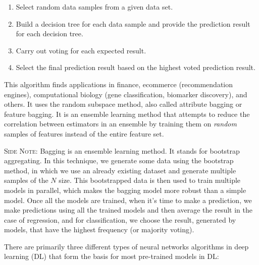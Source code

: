 \documentclass[11pt]{article}
\begin{document}
\begin{itemize}
\begin{enumerate} 
\item Select random data samples from a given data set.
\item Build a decision tree for each data sample and provide the prediction result for each decision tree.
\item Carry out voting for each expected result.
\item  Select the final prediction result based on the highest voted prediction result.
\end{enumerate} 
This algorithm finds applications in finance, ecommerce (recommendation engines), computational biology (gene classification, biomarker discovery), and others. It uses the random subspace method, also called attribute bagging or feature bagging. It is an ensemble learning method that attempts to reduce the correlation between estimators in an ensemble by training them on \emph{random} samples of features instead of the entire feature set.

\textsc{Side Note:} Bagging is an ensemble learning method. It stands for bootstrap aggregating. In this technique, we generate some data using the bootstrap method, in which we use an already existing dataset and generate multiple samples of the $N$ size. This bootstrapped data is then used to train multiple models in parallel, which makes the bagging model more robust than a simple model. Once all the models are trained, when it’s time to make a prediction, we make predictions using all the trained models and then average the result in the case of regression, and for classification, we choose the result, generated by models, that have the highest frequency (or majority voting).



\end{itemize} 

There are primarily three different types of neural networks algorithms in deep learning (DL) that form the basis for most pre-trained models in DL:
\end{document}

